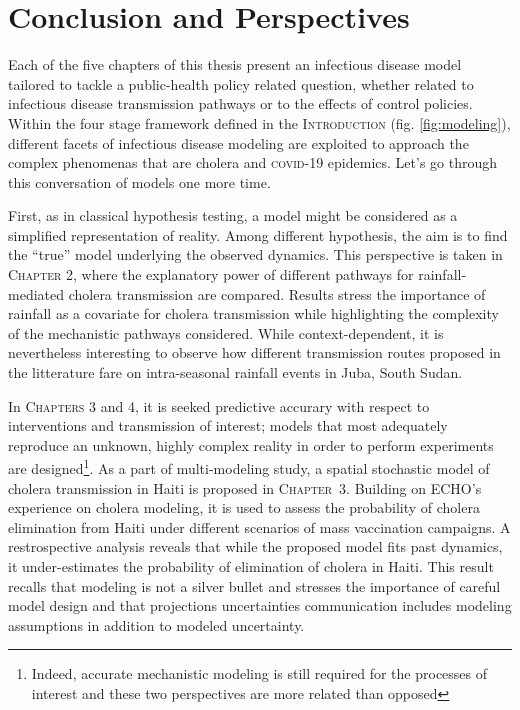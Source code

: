 \chapter*{Conclusion and Perspectives}
Each of the five chapters of this thesis present an infectious disease model tailored to tackle a public-health policy related question, whether related to infectious disease transmission pathways or to the effects of control policies. Within the four stage framework defined in the \textsc{Introduction} (fig. \ref{fig:modeling}), different facets of infectious disease modeling are exploited to approach the complex phenomenas that are cholera and \textsc{covid}-19 epidemics. Let's go through this conversation of models one more time.

First, as in classical hypothesis testing, a model might be considered as a simplified representation of reality. Among different hypothesis, the aim is to find the ``true'' model underlying the observed dynamics. This perspective is taken in \textsc{Chapter 2}, where the explanatory power of different pathways for rainfall-mediated cholera transmission are compared. Results stress the importance of rainfall as a covariate for cholera transmission while highlighting the complexity of the mechanistic pathways considered. While context-dependent, it is nevertheless interesting to observe how different transmission routes proposed in the litterature fare on intra-seasonal rainfall events in Juba, South Sudan.

In \textsc{Chapters 3} and 4, it is seeked predictive accurary with respect to interventions and transmission of interest; models that most adequately reproduce an unknown, highly complex reality in order to perform experiments are designed\footnote{Indeed, accurate mechanistic modeling is still required for the processes of interest and these two perspectives are more related than opposed}. As a part of multi-modeling study, a spatial stochastic model of cholera transmission in Haiti is proposed in \textsc{Chapter~3}. Building on ECHO's experience on cholera modeling, it is used to assess the probability of cholera elimination from Haiti under different scenarios of mass vaccination campaigns. A restrospective analysis reveals that while the proposed model fits past dynamics, it under-estimates the probability of elimination of cholera in Haiti. This result recalls that modeling is not a silver bullet and stresses the importance of careful model design and that projections uncertainties communication includes modeling assumptions in addition to modeled uncertainty.

